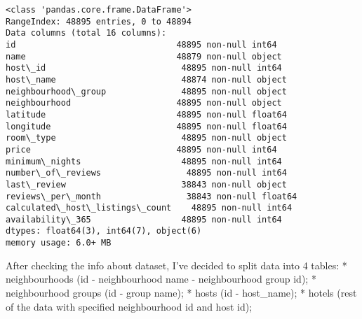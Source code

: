 \documentclass[11pt]{article}
\begin{document}
    \begin{Verbatim}[commandchars=\\\{\}]
<class 'pandas.core.frame.DataFrame'>
RangeIndex: 48895 entries, 0 to 48894
Data columns (total 16 columns):
id                                48895 non-null int64
name                              48879 non-null object
host\_id                           48895 non-null int64
host\_name                         48874 non-null object
neighbourhood\_group               48895 non-null object
neighbourhood                     48895 non-null object
latitude                          48895 non-null float64
longitude                         48895 non-null float64
room\_type                         48895 non-null object
price                             48895 non-null int64
minimum\_nights                    48895 non-null int64
number\_of\_reviews                 48895 non-null int64
last\_review                       38843 non-null object
reviews\_per\_month                 38843 non-null float64
calculated\_host\_listings\_count    48895 non-null int64
availability\_365                  48895 non-null int64
dtypes: float64(3), int64(7), object(6)
memory usage: 6.0+ MB
    \end{Verbatim}

    After checking the info about dataset, I've decided to split data into 4
tables: * neighbourhoods (id - neighbourhood name - neighbourhood group
id); * neighbourhood groups (id - group name); * hosts (id -
host\_name); * hotels (rest of the data with specified neighbourhood id
and host id);
\end{document}
